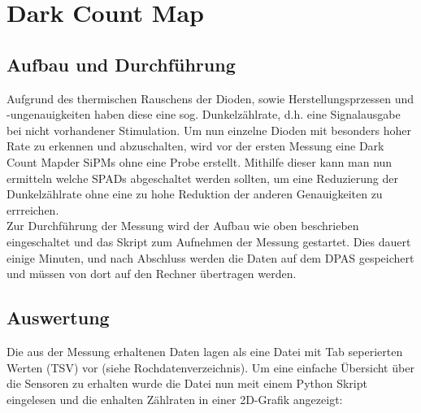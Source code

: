 \documentclass[12pt,twoside,a4paper]{scrartcl}
\begin{document}
	\section{Dark Count Map}
	\label{DCM}

		\subsection{Aufbau und Durchführung}

			Aufgrund des thermischen Rauschens der Dioden, sowie Herstellungsprzessen und -ungenauigkeiten haben diese eine sog. \glqq Dunkelzählrate\grqq, d.h. eine Signalausgabe bei nicht vorhandener Stimulation. Um nun einzelne Dioden mit besonders hoher Rate zu erkennen und abzuschalten, wird vor der ersten Messung eine \glqq Dark Count Map\grqq der SiPMs ohne eine Probe erstellt. Mithilfe dieser kann man nun ermitteln welche SPADs abgeschaltet werden sollten, um eine Reduzierung der Dunkelzählrate ohne eine zu hohe Reduktion der anderen Genauigkeiten zu errreichen.\\
			Zur Durchführung der Messung wird der Aufbau wie oben beschrieben eingeschaltet und das Skript zum Aufnehmen der Messung gestartet. Dies dauert einige Minuten, und nach Abschluss werden die Daten auf dem DPAS gespeichert und müssen von dort auf den Rechner übertragen werden.

		\subsection{Auswertung}

			Die aus der Messung erhaltenen Daten lagen als eine Datei mit Tab seperierten Werten (TSV) vor (siehe Rochdatenverzeichnis). Um eine einfache Übersicht über die Sensoren zu erhalten wurde die Datei nun meit einem Python Skript eingelesen und die enhalten Zählraten in einer 2D-Grafik angezeigt:
\end{document}
